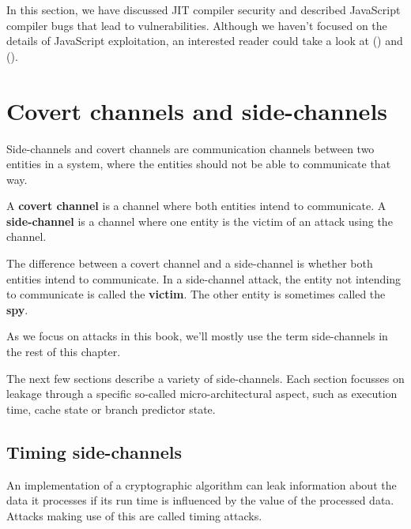\documentclass[
  a4paper,
]{report}
\begin{document}
In this section, we have discussed JIT compiler security and described
JavaScript compiler bugs that lead to vulnerabilities. Although we
haven't focused on the details of JavaScript exploitation, an interested
reader could take a look at () and
().

\chapter{Covert channels and
side-channels}\label{covert-channels-and-side-channels}

Side-channels and covert channels are communication channels between two
entities in a system, where the entities should not be able to
communicate that way.

A \textbf{\label{__index_entry_97}{covert
channel}} is a channel where both entities intend
to communicate. A
\textbf{\label{__index_entry_98}{side-channel}}
is a channel where one entity is the victim of an attack using the
channel.

The difference between a covert channel and a side-channel is whether
both entities intend to communicate. In a side-channel attack, the
entity not intending to communicate is called the
\textbf{\label{__index_entry_99}{victim}}.
The other entity is sometimes called the
\textbf{\label{__index_entry_100}{spy}}.

As we focus on attacks in this book, we'll mostly use the term
side-channels in the rest of this chapter.

The next few sections describe a variety of side-channels. Each section
focusses on leakage through a specific so-called
\label{__index_entry_101}{micro-architectural}
aspect, such as execution time, cache state or branch predictor state.

\section{Timing side-channels}\label{timing-side-channels}

An implementation of a cryptographic algorithm can leak information
about the data it processes if its run time is influenced by the value
of the processed data. Attacks making use of this are called
\label{__index_entry_102}{timing
attacks}.
\end{document}
